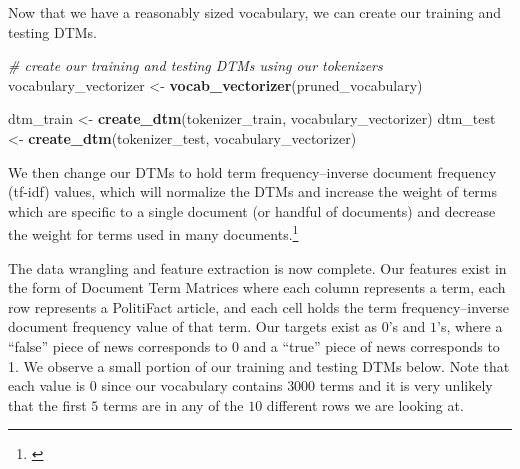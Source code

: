 \documentclass[12pt]{article}
\newenvironment{Shaded}{\begin{snugshade}}{\end{snugshade}}
\newcommand{\CommentTok}[1]{\textcolor[rgb]{0.56,0.35,0.01}{\textit{#1}}}
\newcommand{\KeywordTok}[1]{\textcolor[rgb]{0.13,0.29,0.53}{\textbf{#1}}}
\newcommand{\NormalTok}[1]{#1}
\newcommand{\OperatorTok}[1]{\textcolor[rgb]{0.81,0.36,0.00}{\textbf{#1}}}
\newcommand{\StringTok}[1]{\textcolor[rgb]{0.31,0.60,0.02}{#1}}
\begin{document}
Now that we have a reasonably sized vocabulary, we can create our
training and testing DTMs.

\begin{Shaded}
\begin{Highlighting}[]
\CommentTok{# create our training and testing DTMs using our tokenizers}
\NormalTok{vocabulary_vectorizer <-}\StringTok{ }\KeywordTok{vocab_vectorizer}\NormalTok{(pruned_vocabulary) }

\NormalTok{dtm_train <-}\StringTok{ }\KeywordTok{create_dtm}\NormalTok{(tokenizer_train, vocabulary_vectorizer) }
\NormalTok{dtm_test <-}\StringTok{ }\KeywordTok{create_dtm}\NormalTok{(tokenizer_test, vocabulary_vectorizer)  }
\end{Highlighting}
\end{Shaded}

We then change our DTMs to hold term frequency--inverse document
frequency (tf-idf) values, which will normalize the DTMs and increase
the weight of terms which are specific to a single document (or handful
of documents) and decrease the weight for terms used in many
documents.\footnote{\citet{AnalyzingTextsText2vec}}

\begin{Shaded}
\end{Shaded}

The data wrangling and feature extraction is now complete. Our features
exist in the form of Document Term Matrices where each column represents
a term, each row represents a PolitiFact article, and each cell holds
the term frequency--inverse document frequency value of that term. Our
targets exist as \(0\)'s and \(1\)'s, where a ``false'' piece of news
corresponds to 0 and a ``true'' piece of news corresponds to 1. We
observe a small portion of our training and testing DTMs below. Note
that each value is \(0\) since our vocabulary contains \(3000\) terms
and it is very unlikely that the first \(5\) terms are in any of the
\(10\) different rows we are looking at.
\end{document}
